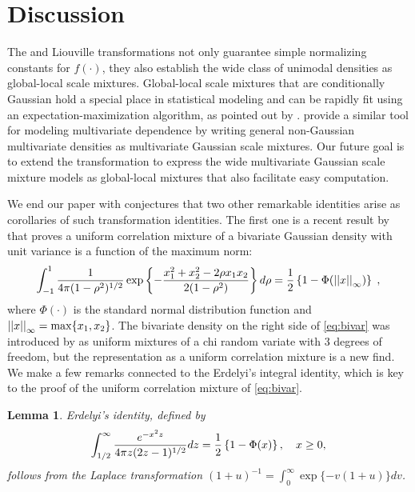 \documentclass[bj]{imsart}
\newtheorem{lemma}[theorem]{Lemma}
\begin{document}
\section{Discussion}
\label{sec:discussion}

The \CS{} and Liouville transformations not only guarantee simple normalizing constants for $f(\cdot)$, they also establish the wide class of unimodal densities as global-local scale mixtures. Global-local scale mixtures that are conditionally Gaussian hold a special place in statistical modeling and can be rapidly fit using an expectation-maximization algorithm, as pointed out by \citet{polson_data_2013}. \citet{palmer_amica:_2011} provide a similar tool for modeling multivariate dependence by writing general non-Gaussian multivariate densities as multivariate Gaussian scale mixtures. Our future goal is to extend the \CS{} transformation to express the wide multivariate Gaussian scale mixture models as global-local mixtures that also facilitate easy computation.

We end our paper with conjectures that two other remarkable identities arise as corollaries of such transformation identities. The first one is a recent result by \cite{zhang2014uniform} that proves a uniform correlation mixture of a bivariate Gaussian density with unit variance is a function of the maximum norm: 
\begin{equation}
  \int_{-1}^{1} \frac{1}{4 \pi (1-\rho^2)^{1/2} } 
  \exp\left\{ - \frac{x_1^2 + x_2^2 - 2 \rho x_1 x_2}{2 (1-\rho^2)} \right\} d\rho = 
  \frac{1}{2} \left\{1- \Phi(\left|\left|x\right|\right|_{\infty})\right\} 
  \;, 
  \label{eq:bivar}
\end{equation}
where $\Phi(\cdot)$ is the standard normal distribution function and $\left|\left|x\right|\right|_{\infty} = \max\{ x_1, x_2\}$. The bivariate density on the
right side of \eqref{eq:bivar} was introduced by \citet{bryson1982constructing} as uniform mixtures of a chi random variate with 3 degrees of freedom, but the representation as a uniform correlation mixture is a new find.  We make a few remarks connected to the Erdelyi's integral identity, which is key to the proof of the uniform correlation mixture of \eqref{eq:bivar}. 
\begin{lemma}
Erdelyi's identity, defined by
\begin{equation}
  \int_{1/2}^{\infty} \frac{e^{-x^2 z}}{4 \pi z 	(2z-1)^{1/2}} dz = \frac{1}{2} \left\{1-\Phi(x)\right\}, \quad x \geq 0, \label{eq:erdelyi}
\end{equation}
follows from the Laplace transformation $(1+u)^{-1} = \int_0^{\infty} \exp\{-v(1+u)\} dv$. 
\end{lemma}
\end{document}
